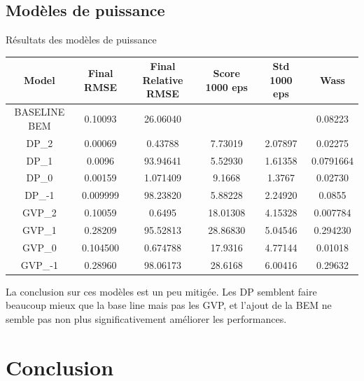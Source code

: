 \documentclass[
11pt,notheorems,hyperref={pdfauthor=whatever}
]{beamer}
\begin{document}
\subsection{Modèles de puissance}
\begin{frame}{Résultats des modèles de puissance}
    \small
   \begin{tabular}{|c|c|c|c|c|c|}
        \hline
        Model & Final RMSE & Final Relative RMSE & Score 1000 eps & Std 1000 eps & Wass \\
        \hline
        BASELINE BEM & 0.10093 & 26.06040 &  &  & 0.08223\\
        \hline
        DP\_2 & 0.00069& 0.43788 & 7.73019 & 2.07897 & 0.02275 \\
        DP\_1 & 0.0096 & 93.94641& 5.52930 & 1.61358 & 0.0791664\\
        DP\_0 & 0.00159 & 1.071409 & 9.1668& 1.3767& 0.02730 \\
        DP\_-1 & 0.009999 & 98.23820 & 5.88228 & 2.24920 & 0.0855\\
        GVP\_2 & 0.10059& 0.6495 & 18.01308 & 4.15328 & 0.007784 \\
        GVP\_1 & 0.28209 & 95.52813 & 28.86830 & 5.04546 & 0.294230 \\
        GVP\_0 & 0.104500& 0.674788 & 17.9316 & 4.77144 & 0.01018 \\
        GVP\_-1 & 0.28960 & 98.06173 & 28.6168& 6.00416 & 0.29632 \\
        \hline
    \end{tabular}

    \vspace{0.3cm}
    
    La conclusion sur ces modèles est un peu mitigée. Les DP semblent faire beaucoup mieux que la base line mais pas les GVP, et
    l'ajout de la BEM ne semble pas non plus significativement améliorer les performances.
    
\end{frame}


\section{Conclusion}
\end{document}
